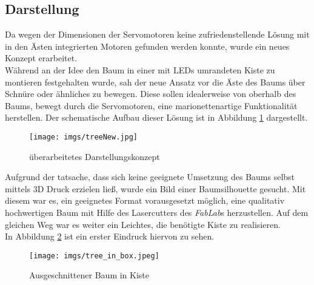 \documentclass[.../Dokumentation.tex]{subfiles}
\begin{document}
\subsection{Darstellung}\label{sec-ita3-visualization}
Da wegen der Dimensionen der Servomotoren keine zufriedenstellende Lösung 
mit in den Ästen integrierten Motoren gefunden werden konnte, wurde ein neues 
Konzept erarbeitet.\\
Während an der Idee den Baum in einer mit LEDs umrandeten Kiste zu montieren 
festgehalten wurde, sah der neue Ansatz vor die Äste des Baums über Schnüre 
oder ähnliches zu bewegen.
Diese sollen idealerweise von oberhalb des Baums, bewegt durch die Servomotoren, 
eine marionettenartige Funktionalität herstellen.
Der schematische Aufbau dieser Lösung ist in Abbildung \ref{fig-treeNew} 
dargestellt.
\begin{figure}[H]
\begin{center}
    \texttt{[image: imgs/treeNew.jpg]}
    \caption{überarbeitetes Darstellungskonzept}
    \label{fig-treeNew}
\end{center}
\end{figure}
Aufgrund der tatsache, dass sich keine geeignete Umsetzung des Baums selbst 
mittels 3D Druck erzielen ließ, wurde ein Bild einer Baumsilhouette gesucht.
Mit diesem war es, ein geeignetes Format vorausgesetzt möglich, eine qualitativ 
hochwertigen Baum mit Hilfe des Lasercutters des \textit{FabLab}s herzustellen.
Auf dem gleichen Weg war es weiter ein Leichtes, die benötigte Kiste zu 
realisieren.\\
In Abbildung \ref{fig-tree-in-box} ist ein erster Eindruck hiervon zu sehen.
\begin{figure}[H]
\begin{center}
    \texttt{[image: imgs/tree\_in\_box.jpeg]}
    \caption{Ausgeschnittener Baum in Kiste}
    \label{fig-tree-in-box}
\end{center}
\end{figure}
\end{document}
